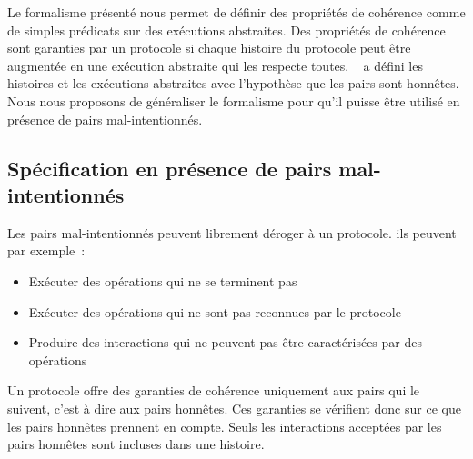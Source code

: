 
Le formalisme présenté nous permet de définir des propriétés de cohérence comme de simples prédicats sur des exécutions abstraites.
Des propriétés de cohérence sont garanties par un protocole si chaque histoire du protocole peut être augmentée en une exécution abstraite qui les respecte toutes.
~\textcite{burckhardt_eventualconsistency_2014} a défini les histoires et les exécutions abstraites avec l'hypothèse que les pairs sont honnêtes.
Nous nous proposons de généraliser le formalisme pour qu'il puisse être utilisé en présence de pairs mal-intentionnés.


\subsection{Spécification en présence de pairs mal-intentionnés}\label{subsec:consistency-spec-malicious}

%

Les pairs mal-intentionnés peuvent librement déroger à un protocole.
ils peuvent par exemple~:
\begin{itemize}
    \item Exécuter des opérations qui ne se terminent pas
    \item Exécuter des opérations qui ne sont pas reconnues par le protocole
    \item Produire des interactions qui ne peuvent pas être caractérisées par des opérations
\end{itemize}
Un protocole offre des garanties de cohérence uniquement aux pairs qui le suivent, c'est à dire aux pairs honnêtes.
Ces garanties se vérifient donc sur ce que les pairs honnêtes prennent en compte.
Seuls les interactions acceptées par les pairs honnêtes sont incluses dans une histoire.

